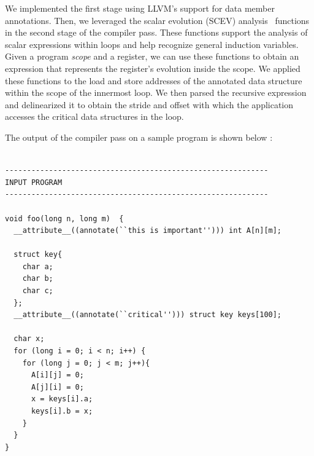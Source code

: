 \documentclass[letterpaper]{article}
\begin{document}
We implemented the first stage using LLVM's support for data member annotations.
Then, we leveraged the scalar evolution (SCEV) analysis~\cite{llvm15} functions
in the second stage of the compiler pass.
These functions support the analysis of scalar expressions within loops and
help recognize general induction variables.
Given a program \textit{scope} and a register, we can use these functions to
obtain an expression that represents the register's evolution inside the scope.
We applied these functions to the load and store addresses of the annotated 
data structure within the scope of the innermost loop. We then parsed the
recursive expression and delinearized it to obtain the stride and offset
with which the application accesses the critical data structures in the loop.

The output of the compiler pass on a sample program is shown below :

\begin{lstlisting}[caption={Sample Input Program},label={lst:input}]

------------------------------------------------------------
INPUT PROGRAM
------------------------------------------------------------

void foo(long n, long m)  {
  __attribute__((annotate(``this is important''))) int A[n][m];
  
  struct key{
    char a;
    char b;
    char c;
  };
  __attribute__((annotate(``critical''))) struct key keys[100];

  char x;
  for (long i = 0; i < n; i++) {
    for (long j = 0; j < m; j++){
      A[i][j] = 0;
      A[j][i] = 0;
      x = keys[i].a;
      keys[i].b = x;
    }
  }
}
\end{lstlisting}
\end{document}
